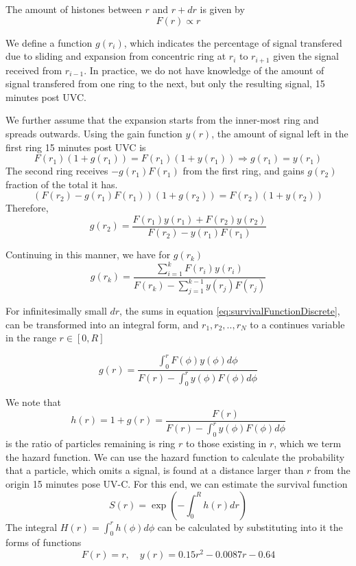 \documentclass[12pt]{report}
\begin{document}
The amount of histones between $r$ and $r+dr$ is given by 
\begin{equation*}
F(r) \propto r
\end{equation*}

We define a function $g(r_i)$, which indicates the percentage of signal transfered due to sliding and expansion from concentric ring at $r_i$ to $r_{i+1}$ given the signal received from $r_{i-1}$. In practice, we do not have knowledge of the amount of signal transfered from one ring to the next, but only the resulting signal, 15 minutes post UVC. 

We further assume that the expansion starts from the inner-most ring and spreads outwards. Using the gain function $y(r)$, the amount of signal left in the first ring 15 minutes post UVC is
\begin{equation*}
F(r_1)(1+g(r_1)) = F(r_1)(1+y(r_1)) \Rightarrow g(r_1)=y(r_1)
\end{equation*}
The second ring receives $-g(r_1)F(r_1)$ from the first ring, and gains $g(r_2)$ fraction of the total it has. 
\begin{equation*}
(F(r_2)-g(r_1)F(r_1))(1+g(r_2))= F(r_2)(1+y(r_2))
\end{equation*}
Therefore, 
\begin{equation*}
 g(r_2)=\frac{F(r_1)y(r_1)+F(r_2)y(r_2)}{F(r_2)-y(r_1)F(r_1)}
\end{equation*}

Continuing in this manner, we have for $g(r_k)$
\begin{equation}\label{eq:survivalFunctionDiscrete}
g(r_k) =\frac{\sum_{i=1}^k F(r_i)y(r_i)}{F(r_k)-\sum_{j=1}^{k-1}y(r_j)F(r_j)} 
\end{equation} 

For infinitesimally small $dr$, the sums in equation \ref{eq:survivalFunctionDiscrete}, can be transformed into an integral form, and $r_1,r_2,..,r_N$ to a continues variable in the range $r\in [0, R]$

\begin{equation}\label{eq:survivalFunctionContinuous}
g(r) =\frac{\int_{0}^r F(\phi)y(\phi)d\phi}{F(r)-\int_{0}^{r}y(\phi)F(\phi)d\phi} 
\end{equation}

We note that
\begin{equation*}
h(r)= 1+g(r) =\frac{F(r)}{F(r)-\int_0^r y(\phi)F(\phi)d\phi}
\end{equation*}
is the ratio of particles remaining is ring $r$ to those existing in $r$, which we term the hazard function. We can use the hazard function to calculate the probability that a particle, which omits a signal, is found at a distance larger than $r$ from the origin 15 minutes pose UV-C. For this end, we can estimate the survival function 
\begin{equation*}
S(r) = \exp(-\int_0^Rh(r)dr)
\end{equation*}
The integral $H(r)=\int_0^r h(\phi)d\phi$ can be calculated by substituting into it the forms of functions
\begin{equation*}
F(r)=r, \quad y(r) =0.15r^2 -0.0087r-0.64
\end{equation*}
\end{document}
